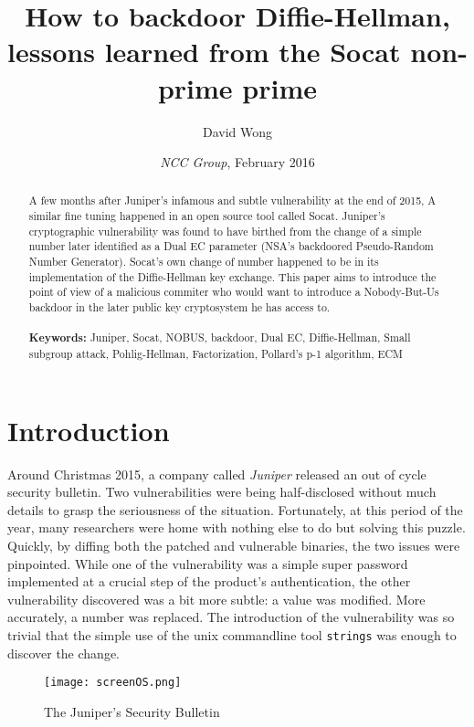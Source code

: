 \documentclass[a4paper,11pt]{article}
\title{How to backdoor Diffie-Hellman, lessons learned from the Socat non-prime prime}
\author{David Wong}
\date{\emph{NCC Group}, \small{February 2016}}
\begin{document}
\maketitle

\renewcommand{\abstractname}{Abstract}
\begin{abstract}
A few months after Juniper's infamous and subtle vulnerability at the end of 2015, A similar fine tuning happened in an open source tool called Socat. Juniper's cryptographic vulnerability was found to have birthed from the change of a simple number later identified as a Dual EC parameter (NSA's backdoored Pseudo-Random Number Generator). Socat's own change of number happened to be in its implementation of the Diffie-Hellman key exchange. This paper aims to introduce the point of view of a malicious commiter who would want to introduce a Nobody-But-Us backdoor in the later public key cryptosystem he has access to.\\
\\
\textbf{Keywords:} Juniper, Socat, NOBUS, backdoor, Dual EC, Diffie-Hellman, Small subgroup attack, Pohlig-Hellman, Factorization, Pollard's p-1 algorithm, ECM\\

\end{abstract}

\section{Introduction}\label{introduction}

Around Christmas 2015, a company called \emph{Juniper} released an out of cycle security bulletin. Two vulnerabilities were being half-disclosed without much details to grasp the seriousness of the situation. Fortunately, at this period of the year, many researchers were home with nothing else to do but solving this puzzle. Quickly, by diffing both the patched and vulnerable binaries, the two issues were pinpointed. While one of the vulnerability was a simple super password implemented at a crucial step of the product's authentication, the other vulnerability discovered was a bit more subtle: a value was modified. More accurately, a number was replaced. The introduction of the vulnerability was so trivial that the simple use of the unix commandline tool \texttt{strings} was enough to discover the change.

\begin{figure}[H]
\centering
\texttt{[image: screenOS.png]}
\caption{The Juniper's Security Bulletin}\label{screenOS}
\end{figure}
\end{document}
